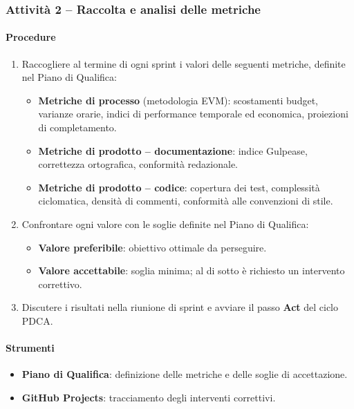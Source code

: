 \documentclass[a4paper, 11pt, oneside]{scrartcl}
\begin{document}
\subsubsection{Attività 2 – Raccolta e analisi delle metriche}

\paragraph{Procedure}
\begin{enumerate}
    \item Raccogliere al termine di ogni sprint i valori delle seguenti metriche, definite nel Piano di Qualifica{\scriptsize{}}:
    \begin{itemize}
        \item \textbf{Metriche di processo} (metodologia EVM{\scriptsize{}}): scostamenti budget, varianze orarie, indici di performance temporale ed economica, proiezioni di completamento.
        \item \textbf{Metriche di prodotto – documentazione}: indice Gulpease{\scriptsize{}}, correttezza ortografica, conformità redazionale.
        \item \textbf{Metriche di prodotto – codice}: copertura dei test, complessità ciclomatica, densità di commenti, conformità alle convenzioni di stile.
    \end{itemize}
    \item Confrontare ogni valore con le soglie definite nel Piano di Qualifica:
    \begin{itemize}
        \item \textbf{Valore preferibile}: obiettivo ottimale da perseguire.
        \item \textbf{Valore accettabile}: soglia minima; al di sotto è richiesto un intervento correttivo.
    \end{itemize}
    \item Discutere i risultati nella riunione di sprint e avviare il passo \textbf{Act} del ciclo PDCA.
\end{enumerate}

\paragraph{Strumenti}
\begin{itemize}
    \item \textbf{Piano di Qualifica}: definizione delle metriche e delle soglie di accettazione.
    \item \textbf{GitHub Projects}: tracciamento degli interventi correttivi.
\end{itemize}
\end{document}
